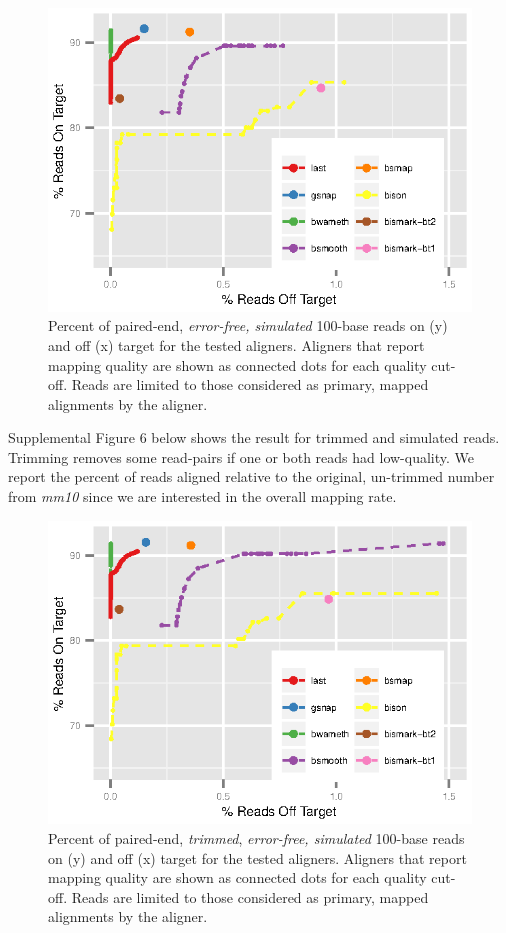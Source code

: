 \documentclass[12pt]{article}
\begin{document}
\begin{figure}[H]%
    \centerline{\includegraphics[width=125mm]{noerrorsim-quals.eps}}
    \caption{Percent of paired-end, \emph{error-free, simulated} 100-base reads on (y) and off (x)
    target for the tested aligners. Aligners that report mapping quality are shown as
    connected dots for each quality cut-off. Reads are limited to those considered as
    primary, mapped alignments by the aligner.
}\label{suppfig:05}
\end{figure}

Supplemental Figure 6 below shows the result for trimmed and simulated reads.
Trimming removes some read-pairs if one or both reads had low-quality. We
report the percent of reads aligned relative to the original, 
un-trimmed number from \emph{mm10} since we are interested in the overall
mapping rate. 
 
\begin{figure}[H]%
    \centerline{\includegraphics[width=125mm]{noerrorsim-trim-quals.eps}}
    \caption{Percent of paired-end, \emph{trimmed}, \emph{error-free, simulated} 100-base reads on (y) and off (x) target for the tested aligners. Aligners that report mapping quality are shown as connected dots for each quality cut-off. Reads are limited to those considered as primary, mapped alignments by the aligner.
}\label{suppfig:06}
\end{figure}
\end{document}
